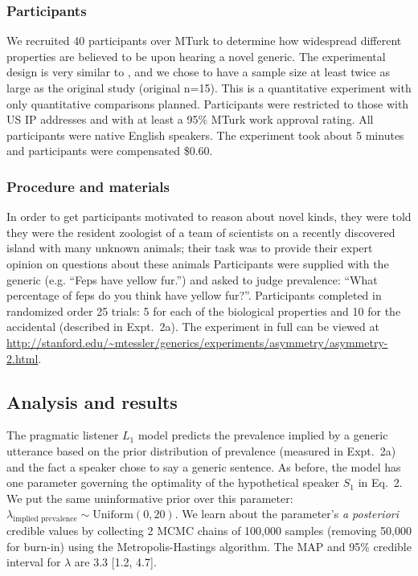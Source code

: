 \documentclass[12pt,letterpaper]{article}
\begin{document}
\subsubsection*{Participants}

We recruited 40 participants over MTurk to determine how widespread different properties are believed to be upon hearing a novel generic.  
The experimental design is very similar to , and we chose to have a sample size at least twice as large as the original study (original n=15). 
This is a quantitative experiment with only quantitative comparisons planned.
Participants were restricted to those with US IP addresses and with at least a 95\% MTurk work approval rating. 
All participants were native English speakers. 
The experiment took about 5 minutes and participants were compensated \$0.60.

\subsubsection*{Procedure and materials}

In order to get participants motivated to reason about novel kinds, they were told they were the resident zoologist of a team of scientists on a recently discovered island with many unknown animals; their task was to provide their expert opinion on questions about these animals
Participants were supplied with the generic (e.g. ``Feps have yellow fur.'') and asked to judge prevalence: ``What percentage of feps do you think have yellow fur?''. 
Participants completed in randomized order 25 trials: 5 for each of the biological properties and 10 for the accidental (described in Expt.~2a).
The experiment in full can be viewed at \url{http://stanford.edu/~mtessler/generics/experiments/asymmetry/asymmetry-2.html}. 

\subsection*{Analysis and results}


The pragmatic listener $L_1$ model predicts the prevalence implied by a generic utterance based on the prior distribution of prevalence (measured in Expt.~2a) and the fact a speaker chose to say a generic sentence.
As before, the model has one parameter governing the optimality of the hypothetical speaker $S_1$ in Eq.~2. 
We put the same uninformative prior over this parameter: $\lambda_{\text{implied prevalence}} \sim \text{Uniform}(0, 20)$.
We learn about the parameter's \emph{a posteriori} credible values by collecting 2 MCMC chains of 100,000 samples (removing 50,000 for burn-in) using the Metropolis-Hastings algorithm. The MAP and 95\% credible interval for $\lambda$ are 3.3 [1.2, 4.7].
\end{document}
